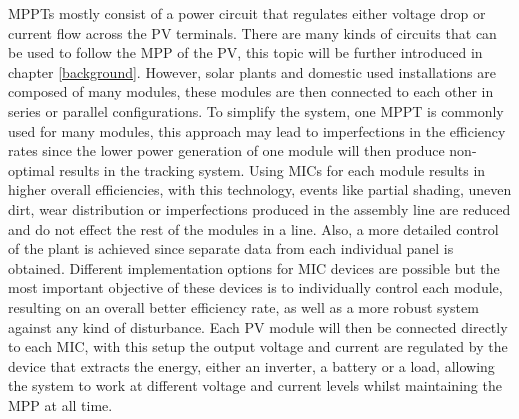 MPPTs mostly consist of a power circuit that regulates either voltage drop or current flow across the PV terminals. There are many kinds of circuits that can be used to follow the MPP of the PV, this topic will be further introduced in chapter \ref{background}. 
However, solar plants and domestic used installations are composed of many modules, these modules are then connected to each other in series or parallel configurations. To simplify the system, one MPPT is commonly used for many modules, this approach may lead to imperfections in the efficiency rates since the lower power generation of one module will then produce non-optimal results in the tracking system. 
Using MICs for each module results in higher overall efficiencies, with this technology, events like partial shading, uneven dirt, wear distribution or imperfections produced in the assembly line are reduced and do not effect the rest of the modules in a line. Also, a more detailed control of the plant is achieved since separate data from each individual panel is obtained.
Different implementation options for MIC devices are possible but the most important objective of these devices is to individually control each module, resulting on an overall better efficiency rate, as well as a more robust system against any kind of disturbance. Each PV module will then be connected directly to each MIC, with this setup the output voltage and current are regulated by the device that extracts the energy, either an inverter, a battery or a load, allowing the system to work at different voltage and current levels whilst maintaining the MPP at all time.



